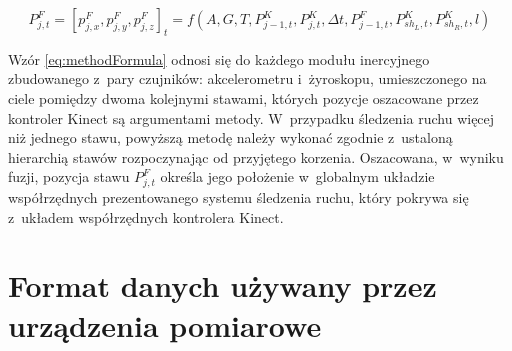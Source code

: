 \begin{equation}
	P^F_{j,t} = [p_{j,x}^F,p_{j,y}^F,p_{j,z}^F]_t = f(A,G,T,P_{j-1,t}^K,P_{j,t}^K,\Delta t, P^F_{j-1,t}, P^K_{sh_L,t},P^K_{sh_R,t},l) 
	\label{eq:methodFormula}
\end{equation}
		
		
Wzór \ref{eq:methodFormula} odnosi się do każdego modułu inercyjnego zbudowanego z~pary czujników: akcelerometru i~żyroskopu, umieszczonego na ciele pomiędzy dwoma kolejnymi stawami, których pozycje oszacowane przez kontroler Kinect są argumentami metody. W~przypadku śledzenia ruchu więcej niż jednego stawu, powyższą metodę należy wykonać zgodnie z~ustaloną hierarchią stawów rozpoczynając od przyjętego korzenia. Oszacowana, w~wyniku fuzji, pozycja stawu $P^F_{j,t}$ określa jego położenie w~globalnym układzie współrzędnych prezentowanego systemu śledzenia ruchu, który pokrywa się z~układem współrzędnych kontrolera Kinect.
		
\section{Format danych używany przez urządzenia pomiarowe}
